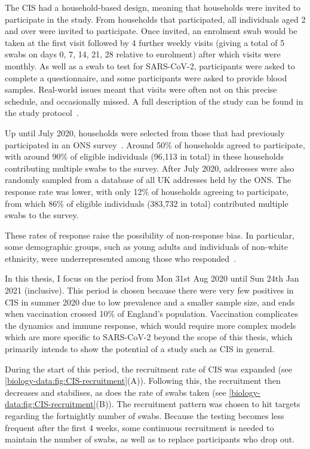 \documentclass[thesis.tex]{subfiles}
\begin{document}
The CIS had a household-based design, meaning that households were invited to participate in the study.
From households that participated, all individuals aged 2 and over were invited to participate.
Once invited, an enrolment swab would be taken at the first visit followed by 4 further weekly visits (giving a total of 5 swabs on days 0, 7, 14, 21, 28 relative to enrolment) after which visits were monthly.
As well as a swab to test for SARS-CoV-2, participants were asked to complete a questionnaire, and some participants were asked to provide blood samples.
Real-world issues meant that visits were often not on this precise schedule, and occasionally missed.
A full description of the study can be found in the study protocol~\autocite{cisProtocol}.

Up until July 2020, households were selected from those that had previously participated in an ONS survey~\autocite{CIStechData}.
Around 50\% of households agreed to participate, with around 90\% of eligible individuals (96,113 in total) in these households contributing multiple swabs to the survey.
After July 2020, addresses were also randomly sampled from a database of all UK addresses held by the ONS.
The response rate was lower, with only 12\% of households agreeing to participate, from which 86\% of eligible individuals (383,732 in total) contributed multiple swabs to the survey.

These rates of response raise the possibility of non-response bias.
In particular, some demographic groups, such as young adults and individuals of non-white ethnicity, were underrepresented among those who responded~\autocite{pouwelsCommunity}.

In this thesis, I focus on the period from Mon 31st Aug 2020 until Sun 24th Jan 2021 (inclusive).
This period is chosen because there were very few positives in CIS in summer 2020 due to low prevalence and a smaller sample size, and ends when vaccination crossed 10\% of England's population.
Vaccination complicates the dynamics and immune response, which would require more complex models which are more specific to SARS-CoV-2 beyond the scope of this thesis, which primarily intends to show the potential of a study such as CIS in general.

During the start of this period, the recruitment rate of CIS was expanded (see \cref{biology-data:fig:CIS-recruitment}(A)).
Following this, the recruitment then decreases and stabilises, as does the rate of swabs taken (see \cref{biology-data:fig:CIS-recruitment}(B)).
The recruitment pattern was chosen to hit targets regarding the fortnightly number of swabs.
Because the testing becomes less frequent after the first 4 weeks, some continuous recruitment is needed to maintain the number of swabs, as well as to replace participants who drop out.
\end{document}

